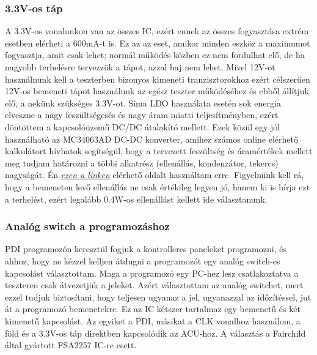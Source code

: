 \documentclass[a4paper, 12pt]{article}
\newcommand{\tab}{\hspace*{1em}}
\begin{document}
\subsubsection{3.3V-os táp}
\tab A 3.3V-os vonalunkon van az összes IC, ezért ennek az összes fogyasztása extrém esetben elérheti a 600mA-t is. Ez az az eset, amikor minden eszköz a maximumot fogyasztja, amit csak lehet; normál működés közben ez nem fordulhat elő, de ha nagyobb terhelésre tervezzük a tápot, azzal baj nem lehet. Mivel 12V-ot használnunk kell a teszterben bizonyos kimeneti tranzisztorokhoz ezért célszerűen 12V-os bemeneti tápot használunk az egész teszter működéséhez és ebből állítjuk elő, a nekünk szükséges 3.3V-ot. Sima LDO használata esetén sok energia elveszne a nagy feszültségesés és nagy áram miatti teljesítményben, ezért döntöttem a kapcsolóüzemű DC/DC átalakító mellett. Ezek közül egy jól használható az MC34063AD \cite{dcdc} DC-DC konverter, amihez számos online elérhető kalkulátort hívhatok segítségül, hogy a tervezett feszültség és áramértékek mellett meg tudjam határozni a többi alkatrész (ellenállás, kondenzátor, tekercs) nagyságát. Én \emph{\href{http://www.bobtech.ro/tutoriale/componente-electronice/43-calculator-online-mc34063a-mc34063-step-down-step-up-inverter}{ezen a linken}} elérhető oldalt használtam erre.
Figyelnünk kell rá, hogy a bemeneten levő ellenállás ne csak értékileg legyen jó, hanem ki is bírja ezt a terhelést, ezért legalább 0.4W-os ellenállást kellett ide választanunk.

\subsubsection{Analóg switch a programozáshoz}
\tab PDI programozón keresztül fogjuk a kontrolleres paneleket programozni, és ahhoz, hogy ne kézzel kelljen átdugni a programozót egy analóg switch-es kapcsolást választottam. Maga a programozó egy PC-hez lesz csatlakoztatva a teszteren csak átvezetjük a jeleket. Azért választottam az analóg switchet, mert ezzel tudjuk biztosítani, hogy teljesen ugyanaz a jel, ugyanazzal az időzítéssel, jut át a programozó bemenetekre. Ez az IC kétszer tartalmaz egy bemenetű és két kimenetű kapcsolást. Az egyiket a PDI, másikat a CLK vonalhoz használom, a föld és a 3.3V-os táp direktben kapcsolódik az ACU-hoz. A választás a Fairchild\texttrademark{} által gyártott FSA2257\cite{switch} IC-re esett.
\end{document}
